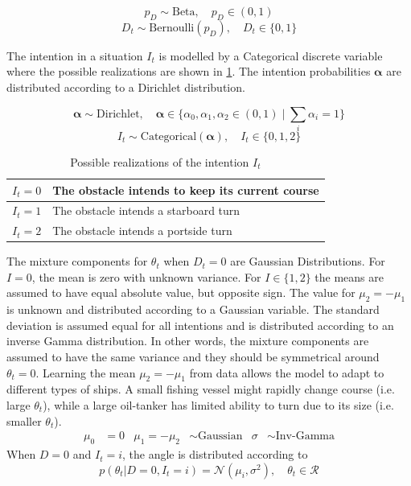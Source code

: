 \begin{equation}
    p_D \sim \text{Beta}, \quad p_D \in (0, 1)
\end{equation}
\begin{equation}
    D_t \sim \text{Bernoulli}(p_D), \quad D_t \in \{0, 1\}
\end{equation}

The intention in a situation $I_t$ is modelled by a Categorical discrete variable where the possible realizations are shown in \cref{tbl:intentions}. The intention probabilities $\boldsymbol{\alpha}$ are distributed according to a Dirichlet distribution.

\begin{equation}
    \boldsymbol{\alpha} \sim \text{Dirichlet}, \quad \boldsymbol{\alpha} \in \{\alpha_0, \alpha_1, \alpha_2 \in (0, 1) \; | \; \sum_i \alpha_i = 1 \}
\end{equation}
\begin{equation}
    I_t \sim \text{Categorical}(\boldsymbol{\alpha}), \quad I_t \in \{0, 1, 2\}
\end{equation}

\begin{table}[h]
\centering
\begin{tabular}{|l|l|}
\hline
$I_t=0$ & The obstacle intends to keep its current course \\ \hline
$I_t=1$ & The obstacle intends a starboard turn           \\ \hline
$I_t=2$ & The obstacle intends a portside turn            \\ \hline
\end{tabular}
\caption{Possible realizations of the intention $I_t$}
\label{tbl:intentions}
\end{table}


The mixture components for $\theta_t$ when $D_t=0$ are Gaussian Distributions. For $I=0$, the mean is zero with unknown variance. For $I \in \{1, 2\}$ the means are assumed to have equal absolute value, but opposite sign. The value for $\mu_2 = -\mu_1$ is unknown and distributed according to a Gaussian variable. The standard deviation is assumed equal for all intentions and is distributed according to an inverse Gamma distribution. In other words, the mixture components are assumed to have the same variance and they should be symmetrical around $\theta_t=0$.
Learning the mean $\mu_2 = -\mu_1$ from data allows the model to adapt to different types of ships. A small fishing vessel might rapidly change course (i.e. large $\theta_t$), while a large oil-tanker has limited ability to turn due to its size (i.e. smaller $\theta_t$). 
\begin{align}
    \mu_0 &= 0 &  \mu_{1} = - \mu_{2} &\sim \text{Gaussian} & \sigma &\sim \text{Inv-Gamma}
\end{align}
When $D=0$ and $I_t=i$, the angle is distributed according to
\begin{equation}\label{eq:theta_intention_mixture}
    p(\theta_t | D=0, I_t=i) = \mathcal{N}(\mu_i, \sigma^2), \quad \theta_t \in \mathcal{R}
\end{equation}

